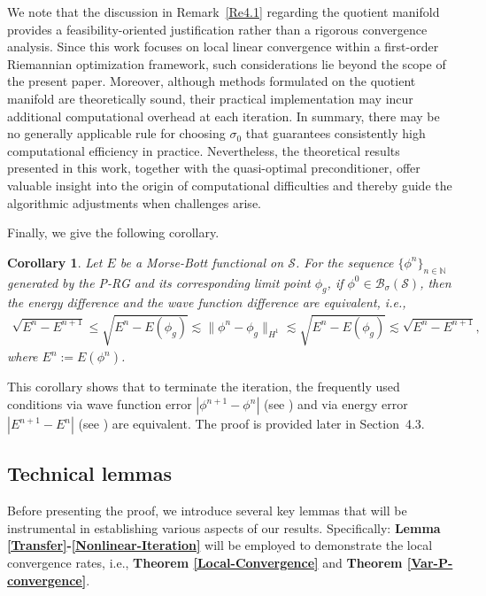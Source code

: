 \documentclass[preprint,3p]{elsarticle}
\newtheorem{corollary}{Corollary}[section]
\begin{document}
	{We note that the discussion in Remark~\ref{Re4.1} regarding the quotient manifold provides a feasibility-oriented justification rather than a rigorous convergence analysis. Since this work focuses on local linear convergence within a first-order Riemannian optimization framework, such considerations lie beyond the scope of the present paper. Moreover, although methods formulated on the quotient manifold are theoretically sound, their practical implementation may incur additional computational overhead at each iteration. In summary, there may be no generally applicable rule for choosing $\sigma_0$ that guarantees consistently high computational efficiency in practice. Nevertheless, the theoretical results presented in this work, together with the quasi-optimal preconditioner, offer valuable insight into the origin of computational difficulties and thereby guide the algorithmic adjustments when challenges arise.}

Finally, we give the following corollary.
\begin{corollary}\label{E-eq-Phi}
	Let $E$ be a Morse-Bott functional on $\mathcal{S}$. For the sequence $\{\phi^n\}_{n\in\mathbb{N}}$ generated by the P-RG and its corresponding limit point $\phi_g$, if $\phi^0\in\mathcal{B}_{\sigma}(\mathcal{S})$, then the energy difference and the wave function difference are equivalent, i.e.,
	\begin{align*}
		\sqrt{E^{n}-E^{n+1}}\le \sqrt{E^{n}-E(\phi_g)}\lesssim\|\phi^{n}-\phi_g\|_{H^1}\lesssim \sqrt{E^{n}-E(\phi_g)}\lesssim \sqrt{E^{n}-E^{n+1}},
	\end{align*}
	where $E^n:=E(\phi^n)$.
\end{corollary}
This corollary shows that to terminate the iteration, the frequently used conditions via wave function error $|\phi^{n+1}-\phi^n|$ (see \cite{2003Computing}) and via energy error $|E^{n+1}-E^n|$ (see \cite{2017Efficient}) are equivalent. {The proof is provided later in Section~4.3.}

\subsection{Technical lemmas}
Before presenting the proof, we introduce several key lemmas that will be instrumental in establishing various aspects of our results. Specifically: {\bf Lemma \ref{Transfer}-\ref{Nonlinear-Iteration}} will be employed to demonstrate the local convergence rates, i.e., {\bf Theorem \ref{Local-Convergence}} and {\bf Theorem \ref{Var-P-convergence}}.
\end{document}
